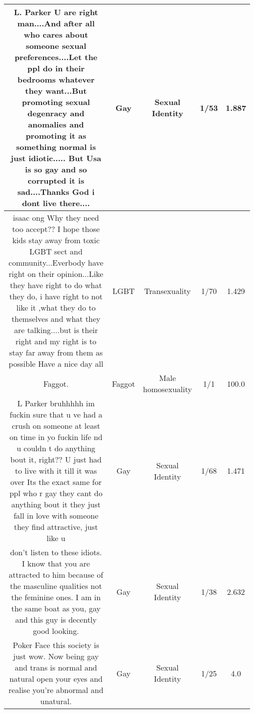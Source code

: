 \documentclass[11pt]{article}
\newlength\mylength
\begin{document}
\begin{center}
\begin{longtable}{|C{.40\mylength}|C{.30\mylength}|C{.15\mylength}|C{.15\mylength}|C{.15\mylength}|}
  L. Parker U are right man....And after all who cares about someone sexual preferences....Let the ppl do in their bedrooms whatever they want...But promoting sexual degenracy and anomalies and promoting it as something normal is just idiotic..... But Usa is so gay and so corrupted it is sad....Thanks God i dont live there....  & Gay & Sexual Identity & 1/53 & 1.887 \\  \hline
  isaac ong Why they need too accept?? I hope those kids stay away from toxic LGBT sect and community...Everbody have right on their opinion...Like they have right to do what they do, i have right to not like it ,what they do to themselves and what they are talking....but is their right and my right is to stay far away from them as possible     Have a nice day all  & LGBT & Transexuality & 1/70 & 1.429 \\  \hline
  Faggot.  & Faggot & Male homosexuality & 1/1 & 100.0 \\  \hline
  L Parker bruhhhhh im fuckin sure that u ve had a crush on someone at least on time in yo fuckin life nd u couldn t do anything bout it, right?? U just had to live with it till it was over Its the exact same for ppl who r gay they cant do anything bout it they just fall in love with someone they find attractive, just like u  & Gay & Sexual Identity & 1/68 & 1.471 \\  \hline
  don't listen to these idiots. I know that you are attracted to him because of the masculine qualities not the feminine ones. I am in the same boat as you, gay and this guy is decently good looking.  & Gay & Sexual Identity & 1/38 & 2.632 \\  \hline
  Poker Face this society is just wow. Now being gay and trans is  normal  and  natural  open your eyes and realise you're abnormal and unatural.  & Gay & Sexual Identity & 1/25 & 4.0 \\  \hline

\end{longtable}
\end{center}
\end{document}
